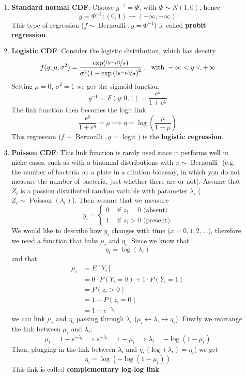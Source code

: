      \begin{enumerate}
        \item \textbf{Standard normal CDF}: Choose $g^{-1}=\Phi$, with $\Phi \sim N(1,0)$, hence
          $$g = \Phi^{-1} : (0,1) \to (-\infty, +\infty)$$
          This type of regression ($f \sim \text{ Bernoulli }, g = \Phi^{-1}$) is called \textbf{probit regression}.
        \item \textbf{Logistic CDF}: Consider the logistic distribution, which has density
          $$f(y; \mu, \sigma^2) = \frac{\exp(\nicefrac{(y-\mu)}{\sigma})}{\sigma^2(1 + \exp\left(\nicefrac{(y-\mu)}{\sigma}\right)^2}\;,\; \text{ with } -\infty < y < +\infty$$
          Setting $\mu = 0$, $\sigma^2 = 1$ we get the sigmoid function
          $$g^{-1} = F(y; 0, 1) = \frac{e^y}{1 + e^y}$$
          The link function then becomes the logit link
          $$\frac{e^\eta}{1 + e^\eta} = \mu \implies \eta = \log\left(\frac{\mu}{1-\mu}\right)$$
          This regression ($f \sim \text{ Bernoulli }, g = \text{ logit }$) is the \textbf{logistic regression}. 
        \item \textbf{Poisson CDF}: This link function is rarely used since it performs well in niche cases, such as with a binomial distributions with $\pi \sim \text{ Bernoulli }$ (e.g. the number of bacteria on a plate in a dilution bioassay, in which you do not measure the number of bacteria, just whether there are or not). Assume that $Z_i$ is a possion distributed random variable with parameter $\lambda_i$ ($Z_i \sim \text{ Poisson }(\lambda_i)$). Then assume that we measure
        $$
        y_i = 
        \begin{cases}
          0 & \text{ if } z_i = 0 \text{ (absent)} \\
          1 & \text{ if }  z_i > 0 \text{ (present)}
        \end{cases}
        $$
        We would like to describe how $y_i$ changes with time ($x = 0, 1, 2, \dots$), therefore we need a function that links $\mu_i$ and $\eta_i$.
        Since we know that 
        $$\eta_i = \log(\lambda_i)$$
        and that
        \begin{align*}
        \mu_i 
          &= E[Y_i] \\
          &= 0 \cdot P(Y_i = 0) + 1 \cdot P(Y_i = 1) \\
          &= P(z_i > 0) \\ 
          &= 1 - P(z_i = 0) \\
          &= 1 - e^{-\lambda_i}
        \end{align*}
        we can link $\mu_i$ and $\eta_i$ passing through $\lambda_i$ ($\mu_i \leftrightarrow \lambda_i \leftrightarrow \eta_i$). Firstly we rearrange the link between $\mu_i$ and $\lambda_i$:
        $$\mu_i = 1 - e^{-\lambda_i} \implies e^{-\lambda_i} = 1 - \mu_i \implies \lambda_i = -\log(1 - \mu_i)$$
        Then, plugging in the link between $\lambda_i$ and $\eta_i$ ($\log(\lambda_i) = \eta_i$) we get
        $$\eta_i = \log(-\log(1-\mu_i))$$
        This link is called \textbf{complementary log-log link}
      \end{enumerate}

